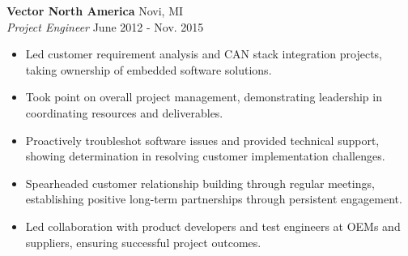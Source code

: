 \vspace{0.75em}

\noindent
\textbf{Vector North America} \hfill Novi, MI \\
\textit{Project Engineer} \hfill June 2012 - Nov. 2015 \\
\begin{itemize}[leftmargin=*,noitemsep,topsep=3pt]
    \item Led customer requirement analysis and CAN stack integration projects, taking ownership of embedded software solutions.
    \item Took point on overall project management, demonstrating leadership in coordinating resources and deliverables.
    \item Proactively troubleshot software issues and provided technical support, showing determination in resolving customer implementation challenges.
    \item Spearheaded customer relationship building through regular meetings, establishing positive long-term partnerships through persistent engagement.
    \item Led collaboration with product developers and test engineers at OEMs and suppliers, ensuring successful project outcomes.
\end{itemize}